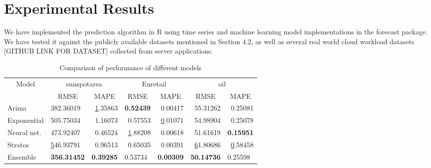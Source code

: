 
\section{Experimental Results}

We have implemented the prediction algorithm in R using time series and machine learning model implementations in the forecast package. We have tested it against the publicly available datasets mentioned in Section 4.2, as well as several real world cloud workload datasets [GITHUB LINK FOR DATASET] collected from server applications.

\begin{table}[]
\centering
\caption{Comparison of performance of different models}
\label{my-label}
\begin{tabular}{|l|l|r|r|r|r|r|}
\hline
\multicolumn{1}{|c|}{\multirow{2}{*}{Model}} & \multicolumn{2}{c|}{sunspotarea}                                  & \multicolumn{2}{c|}{Euretail}                                        & \multicolumn{2}{c|}{oil}                                              \\ \cline{2-7} 
\multicolumn{1}{|c|}{}                       & \multicolumn{1}{c|}{RMSE} & \multicolumn{1}{c|}{MAPE}             & \multicolumn{1}{c|}{RMSE}    & \multicolumn{1}{c|}{MAPE}             & \multicolumn{1}{c|}{RMSE}              & \multicolumn{1}{c|}{MAPE}    \\ \hline
Arima                                        & 382.36019                 & {\ul 1.35863}                         & \textbf{0.52439}             & 0.00417                               & 55.31262                               & 0.25081                      \\ \hline
Exponential                                  & 505.75034                 & 1.16073                               & 0.57553                      & {\ul 0.01071}                         & 54.98904                               & 0.25078                      \\ \hline
Neural net.                                  & 473.92407                 & 0.46524                               & {\ul 1.88208}                & 0.00618                               & 51.61619                               & \textbf{0.15951}             \\ \hline
Stratos                                      & {\ul 546.93791}           & 0.96513                               & 0.65035                      & 0.00391                               & {\ul 61.80686}                         & {\ul 0.58458}                \\ \hline
Ensemble                                     & \textbf{356.31452}        & \multicolumn{1}{l|}{\textbf{0.39285}} & \multicolumn{1}{l|}{0.53734} & \multicolumn{1}{l|}{\textbf{0.00309}} & \multicolumn{1}{l|}{\textbf{50.14736}} & \multicolumn{1}{l|}{0.25598} \\ \hline
\end{tabular}
\end{table}


